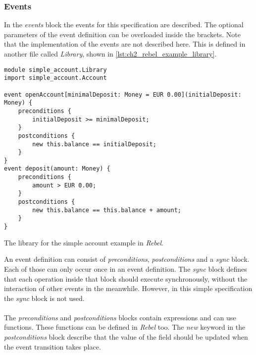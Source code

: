 \subsubsection{Events}
In the \textit{events} block the events for this specification are described.
The optional parameters of the event definition can be overloaded inside the
brackets. Note that the implementation of the events are not described here.
This is defined in another file called \textit{Library}, shown in
\autoref{lst:ch2_rebel_example_library}.
\begin{sourcecode}[!ht]
\begin{lstlisting}[language=Rebel]
module simple_account.Library
import simple_account.Account

event openAccount[minimalDeposit: Money = EUR 0.00](initialDeposit: Money) {
    preconditions {
        initialDeposit >= minimalDeposit;
    }
    postconditions {
        new this.balance == initialDeposit;
    }
}
event deposit(amount: Money) {
    preconditions {
        amount > EUR 0.00;
    }
    postconditions {
        new this.balance == this.balance + amount;
    }
}
\end{lstlisting}
\caption{The library for the simple account example in \textit{Rebel}.}
\label{lst:ch2_rebel_example_library}
\end{sourcecode}
\FloatBarrier\noindent
An event definition can consist of \textit{preconditions},
\textit{postconditions} and a \textit{sync} block. Each of those can only occur once in an event definition. The \textit{sync} block
defines that each operation inside that block should execute synchronously,
without the interaction of other events in the meanwhile. However, in this
simple specification the \textit{sync} block is not used.\\
\\
The \textit{preconditions} and \textit{postconditions} blocks contain
expressions and can use functions. These functions can be defined in
\textit{Rebel} too. The \textit{new} keyword in the \textit{postconditions}
block describe that the value of the field should be updated when the event
transition takes place.

